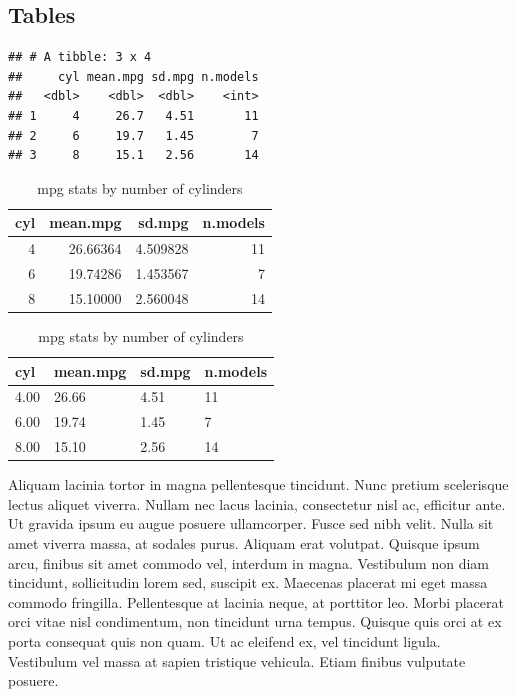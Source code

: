 \documentclass[
  english,
  man,floatsintext]{apa6}
\begin{document}
\hypertarget{tables}{%
\subsection{Tables}\label{tables}}

\begin{verbatim}
## # A tibble: 3 x 4
##     cyl mean.mpg sd.mpg n.models
##   <dbl>    <dbl>  <dbl>    <int>
## 1     4     26.7   4.51       11
## 2     6     19.7   1.45        7
## 3     8     15.1   2.56       14
\end{verbatim}

\begin{table}

\caption{\label{tab:table-avgmpg-kablestyle}mpg stats by number of cylinders}
\centering
\begin{tabular}[t]{r|r|r|r}
\hline
cyl & mean.mpg & sd.mpg & n.models\\
\hline
4 & 26.66364 & 4.509828 & 11\\
\hline
6 & 19.74286 & 1.453567 & 7\\
\hline
8 & 15.10000 & 2.560048 & 14\\
\hline
\end{tabular}
\end{table}

\begin{table}[tbp]

\begin{center}
\begin{threeparttable}

\caption{\label{tab:table-avgmpg-apastyle}mpg stats by number of cylinders}

\begin{tabular}{llll}
\toprule
cyl & \multicolumn{1}{c}{mean.mpg} & \multicolumn{1}{c}{sd.mpg} & \multicolumn{1}{c}{n.models}\\
\midrule
4.00 & 26.66 & 4.51 & 11\\
6.00 & 19.74 & 1.45 & 7\\
8.00 & 15.10 & 2.56 & 14\\
\bottomrule
\end{tabular}

\end{threeparttable}
\end{center}

\end{table}

Aliquam lacinia tortor in magna pellentesque tincidunt. Nunc pretium scelerisque lectus aliquet viverra. Nullam nec lacus lacinia, consectetur nisl ac, efficitur ante. Ut gravida ipsum eu augue posuere ullamcorper. Fusce sed nibh velit. Nulla sit amet viverra massa, at sodales purus. Aliquam erat volutpat. Quisque ipsum arcu, finibus sit amet commodo vel, interdum in magna. Vestibulum non diam tincidunt, sollicitudin lorem sed, suscipit ex. Maecenas placerat mi eget massa commodo fringilla. Pellentesque at lacinia neque, at porttitor leo. Morbi placerat orci vitae nisl condimentum, non tincidunt urna tempus. Quisque quis orci at ex porta consequat quis non quam. Ut ac eleifend ex, vel tincidunt ligula. Vestibulum vel massa at sapien tristique vehicula. Etiam finibus vulputate posuere.
\end{document}
